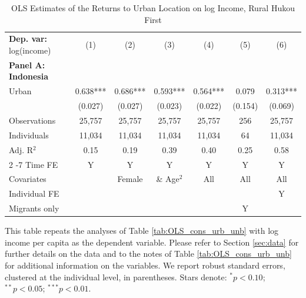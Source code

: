 \begin{table}[htbp] \centering \begin{threeparttable}
 \caption{OLS Estimates of the Returns to Urban Location on log Income, Rural Hukou First} 
 \label{tab:OLS_CHN_hukou_rural_first_income_urban_unb} 
\begin{tabular}{l cccccc} \toprule  \textbf{Dep. var:}  log(income) 
                    &\multicolumn{1}{c}{(1)}   &\multicolumn{1}{c}{(2)}   &\multicolumn{1}{c}{(3)}   &\multicolumn{1}{c}{(4)}   &\multicolumn{1}{c}{(5)}   &\multicolumn{1}{c}{(6)}   \\
\textbf{Panel A: Indonesia} \\
Urban               &       0.638***&       0.686***&       0.593***&       0.564***&       0.079   &       0.313***\\
                    &     (0.027)   &     (0.027)   &     (0.023)   &     (0.022)   &     (0.154)   &     (0.069)   \\
\addlinespace
Observations        &      25,757   &      25,757   &      25,757   &      25,757   &         256   &      25,757   \\
Individuals         &      11,034   &      11,034   &      11,034   &      11,034   &          64   &      11,034   \\
Adj. R$^{2}$        &        0.15   &        0.19   &        0.39   &        0.40   &        0.25   &        0.58   \\
\cmidrule{2 -7} Time FE & Y & Y & Y & Y & Y & Y \\ Covariates & & Female & \& Age$^2$ & All & All & All \\ Individual FE & & & & & & Y \\ Migrants only & & & & & Y & \\ \bottomrule \end{tabular} \begin{tablenotes}[flushleft] \footnotesize \item{This table repeats the analyses of Table \ref{tab:OLS_cons_urb_unb} with log income per capita as the dependent variable. Please refer to Section \ref{sec:data} for further details on the data and to the notes of Table \ref{tab:OLS_cons_urb_unb} for additional information on the variables. We report robust standard errors, clustered at the individual level, in parentheses. Stars denote: $^{*} p<0.10$; $^{**} p<0.05$; $^{***} p<0.01$.} \end{tablenotes} \end{threeparttable} \end{table}
